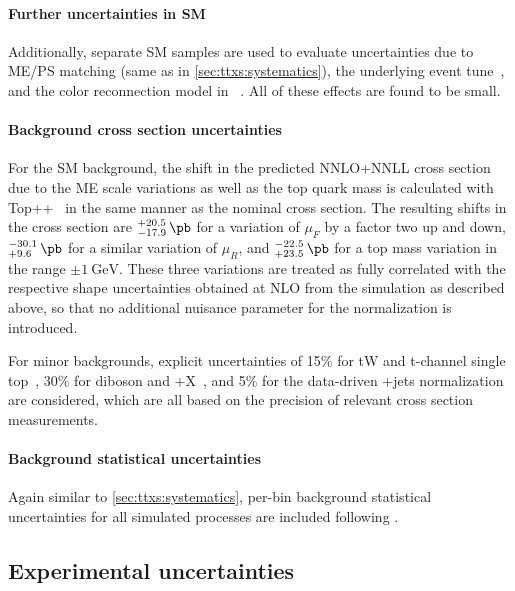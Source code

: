 \paragraph{Further uncertainties in SM \ttbar}
Additionally, separate SM \ttbar samples are used to evaluate uncertainties due to ME/PS matching (same as in \cref{sec:ttxs:systematics}), the underlying event tune~\cite{CMS:GEN-17-001}, and the color reconnection model in \pythia~\cite{CMS:GEN-17-002,Christiansen:2015yqa}. All of these effects are found to be small.

\paragraph{Background cross section uncertainties}
For the SM \ttbar background, the shift in the predicted NNLO+NNLL \ttbar cross section due to the ME scale variations as well as the top quark mass is calculated with Top++~\cite{Czakon:2011xx} in the same manner as the nominal cross section. The resulting shifts in the cross section are ${}^{+20.5}_{-17.9}\,\si{\pb}$ for a variation of $\mu_F$ by a factor two up and down, ${}^{-30.1}_{+9.6}\,\si{\pb}$ for a similar variation of $\mu_R$, and ${}^{-22.5}_{+23.5}\,\si{\pb}$ for a top mass variation in the range $\pm \SI{1}{\GeV}$. These three variations are treated as fully correlated with the respective shape uncertainties obtained at NLO from the \powheg simulation as described above, so that no additional nuisance parameter for the \ttbar normalization is introduced.

For minor backgrounds, explicit uncertainties of 15\% for tW and t-channel single top~\cite{ATLAS:2016ymp,CMS:TOP-17-011,CMS:TOP-17-018}, 30\% for diboson and \ttbar+X~\cite{CMS:TOP-17-005,ATLAS:2019njj}, and 5\% for the data-driven \Zgamma+jets normalization~\cite{ATLAS:2016oxs} are considered, which are all based on the precision of relevant cross section measurements.

\paragraph{Background statistical uncertainties}
Again similar to \cref{sec:ttxs:systematics}, per-bin background statistical uncertainties for all simulated processes are included following .

\subsection{Experimental uncertainties}
\label{sec:ah:expsysts}

